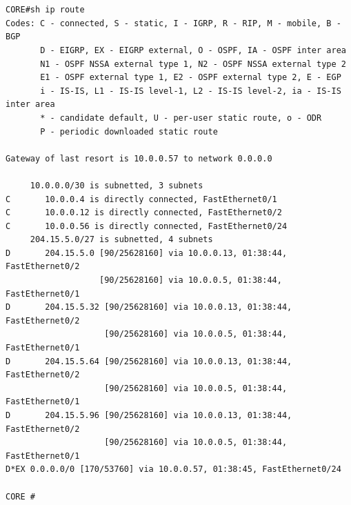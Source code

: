 \documentclass[ a4, 12pt, onecolumn]{IEEEtran}
\begin{document}
\begin{center}
\begin{lstlisting}


CORE#sh ip route
Codes: C - connected, S - static, I - IGRP, R - RIP, M - mobile, B - BGP
       D - EIGRP, EX - EIGRP external, O - OSPF, IA - OSPF inter area
       N1 - OSPF NSSA external type 1, N2 - OSPF NSSA external type 2
       E1 - OSPF external type 1, E2 - OSPF external type 2, E - EGP
       i - IS-IS, L1 - IS-IS level-1, L2 - IS-IS level-2, ia - IS-IS inter area
       * - candidate default, U - per-user static route, o - ODR
       P - periodic downloaded static route

Gateway of last resort is 10.0.0.57 to network 0.0.0.0

     10.0.0.0/30 is subnetted, 3 subnets
C       10.0.0.4 is directly connected, FastEthernet0/1
C       10.0.0.12 is directly connected, FastEthernet0/2
C       10.0.0.56 is directly connected, FastEthernet0/24
     204.15.5.0/27 is subnetted, 4 subnets
D       204.15.5.0 [90/25628160] via 10.0.0.13, 01:38:44, FastEthernet0/2
                   [90/25628160] via 10.0.0.5, 01:38:44, FastEthernet0/1
D       204.15.5.32 [90/25628160] via 10.0.0.13, 01:38:44, FastEthernet0/2
                    [90/25628160] via 10.0.0.5, 01:38:44, FastEthernet0/1
D       204.15.5.64 [90/25628160] via 10.0.0.13, 01:38:44, FastEthernet0/2
                    [90/25628160] via 10.0.0.5, 01:38:44, FastEthernet0/1
D       204.15.5.96 [90/25628160] via 10.0.0.13, 01:38:44, FastEthernet0/2
                    [90/25628160] via 10.0.0.5, 01:38:44, FastEthernet0/1
D*EX 0.0.0.0/0 [170/53760] via 10.0.0.57, 01:38:45, FastEthernet0/24

CORE #
\end{lstlisting}
\end{center}
 
\end{document}
